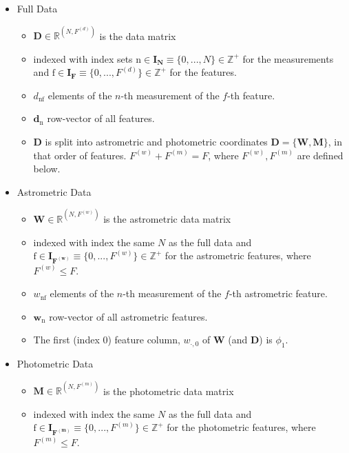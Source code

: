 \documentclass[twocolumn]{aastex631}
\newcommand{\mrm}[1]{\mathrm{#1}}
\newcommand{\mbs}[1]{\boldsymbol{#1}}
\newcommand{\mbf}[1]{\mathbf{#1}}
\newcommand{\mbb}[1]{\mathbb{#1}}
\newcommand{\nth}[1]{{#1}_{\mrm{n}}}
\begin{document}
    \begin{itemize}
        \item Full Data
            \begin{itemize}
                \item $\mbf{D} \in \mbb{R}^{(N, F^{(d)})}$ is the data matrix
                \item indexed with index sets $\mrm{n} \in \mbs{I_N} \equiv \{0, ..., N\} \in \mbb{Z^+}$ for the measurements and $\mrm{f} \in \mbs{I_F}  \equiv \{0, ..., F^{(d)}\} \in \mbb{Z^+}$ for the features.
                \item $d_{\mrm{nf}}$ elements of the $n$-th measurement of the $f$-th feature.
                \item $\nth{\mbs{d}}$ row-vector of all features.
                \item  $\mbf{D}$ is split into astrometric and photometric coordinates $\mbf{D} = \{\mbf{W}, \mbf{M}\}$, in that order of features. $F^{(w)} + F^{(m)} = F$, where $F^{(w)}, F^{(m)}$ are defined below.
            \end{itemize}
        \item Astrometric Data
            \begin{itemize}
                \item $\mbf{W} \in \mathbb{R}^{(N, F^{(w)})}$ is the astrometric data matrix
                \item indexed with index the same $N$ as the full data and $\mrm{f} \in \mbs{I_{F^{(w)}}} \equiv \{0, ..., F^{(w)}\} \in \mathbb{Z^+}$ for the astrometric features, where $F^{(w)} \leq F$.
                \item $w_{\mrm{nf}}$ elements of the $n$-th measurement of the $f$-th astrometric feature.
                \item $\nth{\mbs{w}}$ row-vector of all astrometric features.
                \item The first (index 0) feature column, $w_{\cdot,0}$ of $\mbf{W}$ (and $\mbf{D}$) is $\phi_1$.
            \end{itemize}
        \item Photometric Data
            \begin{itemize}
                \item $\mbf{M} \in \mathbb{R}^{(N, F^{(m)})}$ is the photometric data matrix
                \item indexed with index the same $N$ as the full data and $\mrm{f} \in \mbs{I_{F^{(m)}}} \equiv \{0, ..., F^{(m)}\} \in \mathbb{Z^+}$ for the photometric features, where $F^{(m)} \leq F$.

\end{itemize}
\end{itemize}
\end{document}
